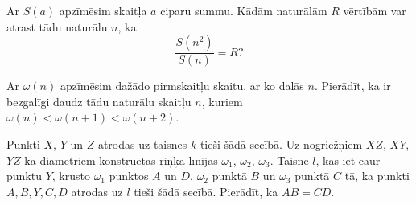 \documentclass[11pt]{article}
\begin{document}
\begin{problem}[BwTst2015.14]
Ar $S(a)$ apzīmēsim skaitļa $a$ ciparu summu. Kādām naturālām $R$ vērtībām var 
atrast tādu naturālu $n$, ka 
\[ \frac{S(n^2)}{S(n)} = R? \]
\end{problem}

\begin{problem}[BwTst2015.15]
Ar $\omega(n)$ apzīmēsim dažādo pirmskaitļu skaitu, ar ko dalās $n$. Pierādīt, ka ir bezgalīgi 
daudz tādu naturālu skaitļu $n$, kuriem $\omega(n) < \omega(n+1) < \omega(n+2)$. 
\end{problem}

\begin{problem}[BwTst2015.16]
Punkti $X$, $Y$ un $Z$ atrodas uz taisnes $k$ tieši šādā secībā. Uz nogriežņiem 
$XZ$, $XY$, $YZ$ kā diametriem konstruētas riņķa līnijas 
$\omega_1$, $\omega_2$, $\omega_3$. Taisne $l$, kas iet caur punktu $Y$, krusto 
$\omega_1$ punktos $A$ un $D$, $\omega_2$ punktā $B$ un $\omega_3$ punktā $C$ tā, 
ka punkti $A,B,Y,C,D$ atrodas uz $l$ tieši šādā secībā. 
Pierādīt, ka $AB = CD$. 
\end{problem}
\end{document}
